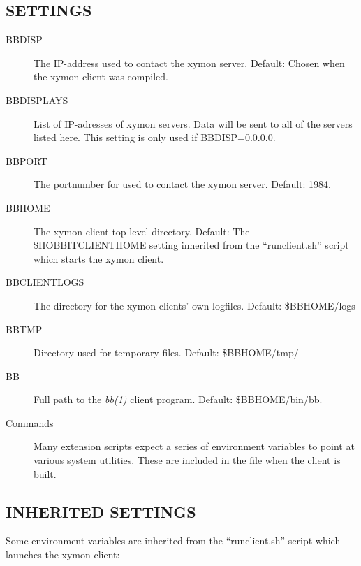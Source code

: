  
\subsection{SETTINGS}

\begin{description}

\item[BBDISP] The IP-address used to contact the xymon
  server. Default: Chosen when the xymon client was compiled. 


 

\item[BBDISPLAYS] List of IP-adresses of xymon servers. Data will be
  sent to all of the servers listed here. This setting is only used if
  BBDISP=0.0.0.0. 


 

\item[BBPORT] The portnumber for used to contact the xymon server. Default: 1984. 

 

\item[BBHOME] The xymon client top-level directory. Default: The
  \$HOBBITCLIENTHOME setting inherited from the ``runclient.sh''
  script which starts the xymon client. 


 

\item[BBCLIENTLOGS] The directory for the xymon clients' own logfiles. Default: \$BBHOME/logs 

 

\item[BBTMP] Directory used for temporary files. Default: \$BBHOME/tmp/ 

 

\item[BB] Full path to the \emph{bb(1)}
 client program. Default: \$BBHOME/bin/bb. 

 

\item[Commands] Many extension scripts expect a series of environment
  variables to point at various system utilities. These are included
  in the file when the client is built. 



\end{description}

\subsection{INHERITED SETTINGS}
 Some environment variables are inherited from the ``runclient.sh'' script which launches the xymon client: 

